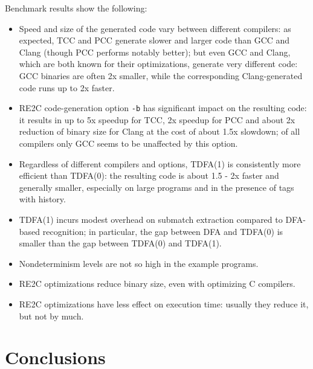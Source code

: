 \documentclass{article}
\theoremstyle{definition}
\begin{document}
\begin{multicols}{2}

Benchmark results show the following:

\begin{itemize}
    \setlength{\parskip}{0.5em}

    \item Speed and size of the generated code vary between different compilers:
        as expected, TCC and PCC generate slower and larger code than GCC and Clang (though PCC performs notably better);
        but even GCC and Clang, which are both known for their optimizations, generate very different code:
        GCC binaries are often 2x smaller, while the corresponding Clang-generated code runs up to 2x faster.

    \item RE2C code-generation option \texttt{-b} has significant impact on the resulting code:
        it results in up to 5x speedup for TCC, 2x speedup for PCC and about 2x reduction of binary size for Clang at the cost of about 1.5x slowdown;
        of all compilers only GCC seems to be unaffected by this option.

    \item Regardless of different compilers and options, TDFA(1) is consistently more efficient than TDFA(0):
        the resulting code is about 1.5 - 2x faster and generally smaller,
        especially on large programs and in the presence of tags with history.

    \item TDFA(1) incurs modest overhead on submatch extraction compared to DFA-based recognition;
        in particular, the gap between DFA and TDFA(0) is smaller than the gap between TDFA(0) and TDFA(1).

    \item Nondeterminism levels are not so high in the example programs.

    \item RE2C optimizations reduce binary size, even with optimizing C compilers.

    \item RE2C optimizations have less effect on execution time: usually they reduce it, but not by much.
    \\
\end{itemize}


\section{Conclusions}\label{section_conclusions}


\end{multicols}
\end{document}
